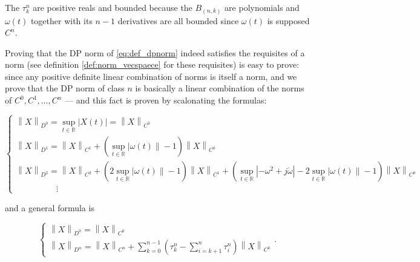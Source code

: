 \begin{definition}
\end{definition}%
\begin{definitionremark} The $\tau_k^n$ are positive reals and bounded because the $B_{(n,k)}$ are polynomials and $\omega(t)$ together with its $n-1$ derivatives are all bounded since $\omega(t)$ is supposed $C^n$. \end{definitionremark}

	Proving that the DP norm of \eqref{eq:def_dpnorm} indeed satisfies the requisites of a norm (see definition \ref{def:norm_vecspaece} for these requisites) is easy to prove: since any positive definite linear combination of norms is itself a norm, and we prove that the DP norm of class $n$ is basically a linear combination of the norms of $C^0,C^1,\dots,C^n$ — and this fact is proven by scalonating the formulas:

\begin{equation}
	\left\{\begin{array}{l}
		\left\lVert X\right\rVert_{D^0} = \sup\limits_{t\in\mathbb{R}} \left\lvert X(t)\right\rvert = \left\lVert X\right\rVert_{C^0}\\[5mm]
		\left\lVert X\right\rVert_{D^1} = \left\lVert X\right\rVert_{C^1} + \left(\sup\limits_{t\in\mathbb{R}} \left\lvert \omega(t)\right\rVert  - 1\right)\left\lVert X\right\rVert_{C^0}\\[5mm]
		\left\lVert X\right\rVert_{D^2} = \left\lVert X\right\rVert_{C^2} + \left(2\sup\limits_{t\in\mathbb{R}} \left\lvert \omega(t)\right\rVert  - 1\right)\left\lVert X\right\rVert_{C^1} + \left(\sup\limits_{t\in\mathbb{R}} \left\lvert -\omega^2 + j\dot{\omega}\right\rvert - 2\sup\limits_{t\in\mathbb{R}} \left\lvert \omega(t)\right\rVert  - 1\right)\left\lVert X\right\rVert_{C^0}\\[5mm]
		\hspace{2cm} \vdots
	\end{array}\right.
\end{equation}

	\noindent and a general formula is

\begin{equation}\left\{\begin{array}{l} \left\lVert X\right\rVert_{D^0} = \left\lVert X \right\rVert_{C^0} \\[5mm] \displaystyle\left\lVert X\right\rVert_{D^n} = \left\lVert X \right\rVert_{C^n} + \sum\limits_{k=0}^{n-1}\left(\tau_k^n - \sum\limits_{i=k+1}^{n} \tau_i^n\right) \left\lVert X \right\rVert_{C^k} \end{array}\right. .\end{equation}

